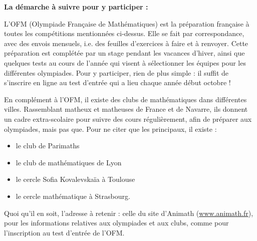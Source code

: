 \bigskip

\textbf{La d\'emarche \`a suivre pour y participer :}

\smallskip

L'OFM (Olympiade Fran\c{c}aise de Math\'ematiques) est la pr\'eparation fran\c{c}aise \`a toutes les comp\'etitions mentionn\'ees ci-dessus. Elle se fait par correspondance, avec des envois mensuels, i.e. des feuilles d'exercices \`a faire et \`a renvoyer. Cette pr\'eparation est compl\'et\'ee par un stage pendant les vacances d'hiver, ainsi que quelques tests au cours de l'ann\'ee qui visent \`a s\'electionner les \'equipes pour les diff\'erentes olympiades. Pour y participer, rien de plus simple : il suffit de s'inscrire en ligne au test d'entr\'ee qui a lieu chaque ann\'ee d\'ebut octobre !

En compl\'ement \`a l'OFM, il existe des clubs de math\'ematiques dans diff\'erentes villes. Rassemblant matheux et matheuses de France et de Navarre, ils donnent un cadre extra-scolaire pour suivre des cours r\'eguli\`erement, afin de pr\'eparer aux olympiades, mais pas que. Pour ne citer que les principaux, il existe :
\begin{itemize}
    \item le club de Parimaths
    \item le club de math\'ematiques de Lyon
    \item le cercle Sofia Kovalevska\"ia \`a Toulouse
    \item le cercle math\'ematique \`a Strasbourg.
\end{itemize}

\bigskip

Quoi qu'il en soit, l'adresse \`a retenir : celle du site d'Animath (\url{www.animath.fr}), pour les informations relatives aux olympiades et aux clubs, comme pour l'inscription au test d'entr\'ee de l'OFM.
